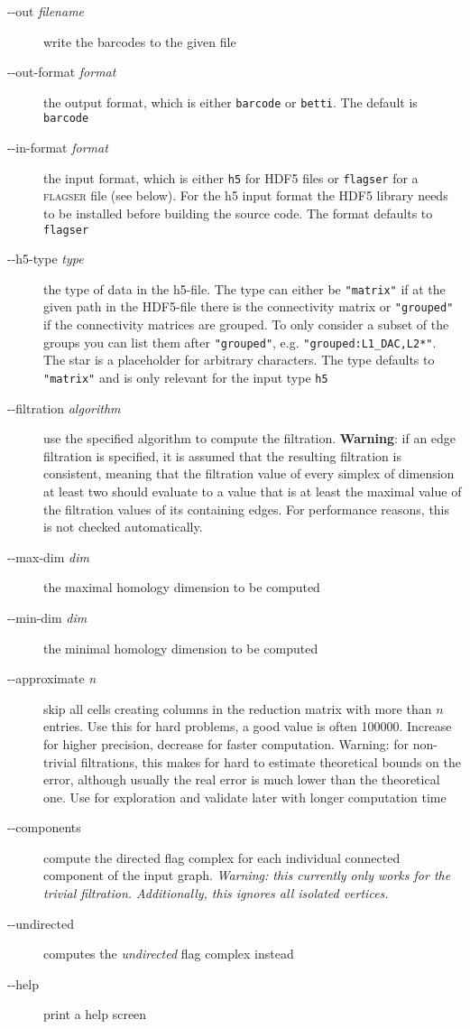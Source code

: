 \documentclass{amsart}
\theoremstyle{definition}
\begin{document}
\enlargethispage{\baselineskip}
\begin{description}
  \item [-{}-out \textit{filename}] write the barcodes to the given file
  \item [-{}-out-format \textit{format}] the output format, which is either \texttt{barcode} or
    \texttt{betti}. The default is \texttt{barcode}
  \item [-{}-in-format \textit{format}] the input format, which is either \texttt{h5} for HDF5 files
    or \texttt{flagser} for a \textsc{flagser} file (see below). For the h5 input format the HDF5
    library needs to be installed before building the source code. The format defaults to
    \texttt{flagser}
  \item [-{}-h5-type \textit{type}] the type of data in the h5-file. The type can either be
    \texttt{"matrix"} if at the given path in the HDF5-file there is the connectivity matrix or \texttt{"grouped"}
    if the connectivity matrices are grouped. To only consider a subset of the groups you can list
    them after \texttt{"grouped"}, e.g. \texttt{"grouped:L1\_DAC,L2*"}. The star is a placeholder for
    arbitrary characters. The type defaults to \texttt{"matrix"} and is only relevant for the input
    type \texttt{h5}
  \item [-{}-filtration \textit{algorithm}] use the specified algorithm to compute the filtration. \textbf{Warning}:
  if an edge filtration is specified, it is assumed that the resulting filtration is consistent, meaning that the
  filtration value of every simplex of dimension at least two should evaluate to a value that is at least the
  maximal value of the filtration values of its containing edges. For performance reasons, this is not checked
  automatically.
  \item [-{}-max-dim \textit{dim}] the maximal homology dimension to be computed
  \item [-{}-min-dim \textit{dim}] the minimal homology dimension to be computed
  \item [-{}-approximate \textit{n}] skip all cells creating columns in the reduction matrix with
    more than $n$ entries. Use this for hard problems, a good value is often 100000. Increase for
    higher precision, decrease for faster computation. Warning: for non-trivial filtrations, this
    makes for hard to estimate theoretical bounds on the error, although usually the real error is
    much lower than the theoretical one. Use for exploration and validate later with longer computation
    time
  \item [-{}-components] compute the directed flag complex for each individual connected
    component of the input graph. \emph{Warning: this currently only works for the trivial
    filtration. Additionally, this ignores all isolated vertices.}
  \item [-{}-undirected] computes the \emph{undirected} flag complex instead
  \item [-{}-help] print a help screen
\end{description}
\end{document}
